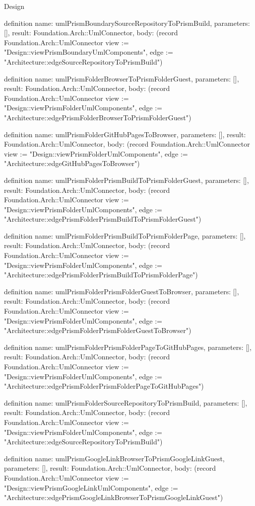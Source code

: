 \begin{lexlean}{Design}
\begin{semanticmodule}
definition{
  name: umlPrismBoundarySourceRepositoryToPrismBuild,
  parameters: [],
  result: Foundation.Arch::UmlConnector,
  body: (record Foundation.Arch::UmlConnector {view := "Design::viewPrismBoundaryUmlComponents", edge := "Architecture::edgeSourceRepositoryToPrismBuild"})
}

definition{
  name: umlPrismFolderBrowserToPrismFolderGuest,
  parameters: [],
  result: Foundation.Arch::UmlConnector,
  body: (record Foundation.Arch::UmlConnector {view := "Design::viewPrismFolderUmlComponents", edge := "Architecture::edgePrismFolderBrowserToPrismFolderGuest"})
}

definition{
  name: umlPrismFolderGitHubPagesToBrowser,
  parameters: [],
  result: Foundation.Arch::UmlConnector,
  body: (record Foundation.Arch::UmlConnector {view := "Design::viewPrismFolderUmlComponents", edge := "Architecture::edgeGitHubPagesToBrowser"})
}

definition{
  name: umlPrismFolderPrismBuildToPrismFolderGuest,
  parameters: [],
  result: Foundation.Arch::UmlConnector,
  body: (record Foundation.Arch::UmlConnector {view := "Design::viewPrismFolderUmlComponents", edge := "Architecture::edgePrismFolderPrismBuildToPrismFolderGuest"})
}

definition{
  name: umlPrismFolderPrismBuildToPrismFolderPage,
  parameters: [],
  result: Foundation.Arch::UmlConnector,
  body: (record Foundation.Arch::UmlConnector {view := "Design::viewPrismFolderUmlComponents", edge := "Architecture::edgePrismFolderPrismBuildToPrismFolderPage"})
}

definition{
  name: umlPrismFolderPrismFolderGuestToBrowser,
  parameters: [],
  result: Foundation.Arch::UmlConnector,
  body: (record Foundation.Arch::UmlConnector {view := "Design::viewPrismFolderUmlComponents", edge := "Architecture::edgePrismFolderPrismFolderGuestToBrowser"})
}

definition{
  name: umlPrismFolderPrismFolderPageToGitHubPages,
  parameters: [],
  result: Foundation.Arch::UmlConnector,
  body: (record Foundation.Arch::UmlConnector {view := "Design::viewPrismFolderUmlComponents", edge := "Architecture::edgePrismFolderPrismFolderPageToGitHubPages"})
}

definition{
  name: umlPrismFolderSourceRepositoryToPrismBuild,
  parameters: [],
  result: Foundation.Arch::UmlConnector,
  body: (record Foundation.Arch::UmlConnector {view := "Design::viewPrismFolderUmlComponents", edge := "Architecture::edgeSourceRepositoryToPrismBuild"})
}

definition{
  name: umlPrismGoogleLinkBrowserToPrismGoogleLinkGuest,
  parameters: [],
  result: Foundation.Arch::UmlConnector,
  body: (record Foundation.Arch::UmlConnector {view := "Design::viewPrismGoogleLinkUmlComponents", edge := "Architecture::edgePrismGoogleLinkBrowserToPrismGoogleLinkGuest"})
}


\end{semanticmodule}
\end{lexlean}
